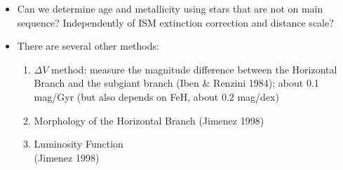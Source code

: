 \documentclass[letterpaper,landscape]{slides}
\begin{document}
\begin{slide}
{\begin{minipage}[t]{13cm}
\begin{itemize}
\item Can we determine age and metallicity using stars that are 
   not on main sequence? Independently of ISM extinction
   correction and distance scale? 
\item {\color{blue} There are several other methods:} 
   \begin{enumerate}
      \item $\Delta V$ method: measure the magnitude difference between
             the Horizontal Branch and the subgiant branch (Iben \& Renzini 1984);
             about 0.1 mag/Gyr (but also depends on FeH, about 0.2 mag/dex)
      \item Morphology of the Horizontal Branch (Jimenez 1998)
      \item Luminosity Function \\ (Jimenez 1998)
   \end{enumerate}
\end{itemize}

\end{minipage}}
\vfill 
\end{slide}
\end{document}
